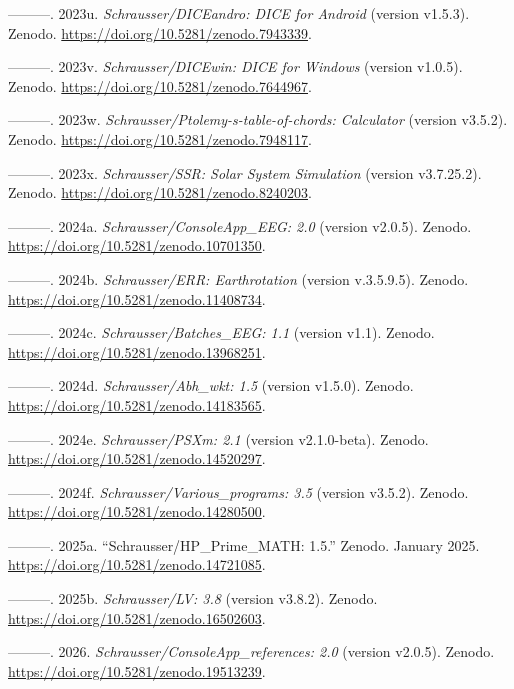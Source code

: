 \documentclass[
]{article}
\newlength{\cslhangindent}
\newlength{\cslentryspacingunit} %
\newenvironment{CSLReferences}[2] %
 {%
  \setlength{\parindent}{0pt}
  \ifodd #1
  \let\oldpar\par
  \def\par{\hangindent=\cslhangindent\oldpar}
  \fi
  \setlength{\parskip}{#2\cslentryspacingunit}
 }%
 {}
\begin{document}
\begin{CSLReferences}{1}{0}
\leavevmode{}%
---------. 2023u. \emph{{Schrausser/DICEandro: DICE for Android}}
(version v1.5.3). Zenodo. \url{https://doi.org/10.5281/zenodo.7943339}.

\leavevmode{}%
---------. 2023v. \emph{{Schrausser/DICEwin: DICE for Windows}} (version
{v1.0.5}). Zenodo. \url{https://doi.org/10.5281/zenodo.7644967}.

\leavevmode{}%
---------. 2023w. \emph{{Schrausser/Ptolemy-s-table-of-chords:
Calculator}} (version v3.5.2). Zenodo.
\url{https://doi.org/10.5281/zenodo.7948117}.

\leavevmode{}%
---------. 2023x. \emph{{Schrausser/SSR: Solar System Simulation}}
(version v3.7.25.2). Zenodo.
\url{https://doi.org/10.5281/zenodo.8240203}.

\leavevmode{}%
---------. 2024a. \emph{Schrausser/ConsoleApp\_EEG: 2.0} (version
v2.0.5). Zenodo. \url{https://doi.org/10.5281/zenodo.10701350}.

\leavevmode{}%
---------. 2024b. \emph{Schrausser/ERR: Earthrotation} (version
v.3.5.9.5). Zenodo. \url{https://doi.org/10.5281/zenodo.11408734}.

\leavevmode{}%
---------. 2024c. \emph{Schrausser/Batches\_EEG: 1.1} (version v1.1).
Zenodo. \url{https://doi.org/10.5281/zenodo.13968251}.

\leavevmode{}%
---------. 2024d. \emph{Schrausser/Abh\_wkt: 1.5} (version v1.5.0).
Zenodo. \url{https://doi.org/10.5281/zenodo.14183565}.

\leavevmode{}%
---------. 2024e. \emph{Schrausser/PSXm: 2.1} (version v2.1.0-beta).
Zenodo. \url{https://doi.org/10.5281/zenodo.14520297}.

\leavevmode{}%
---------. 2024f. \emph{Schrausser/Various\_programs: 3.5} (version
v3.5.2). Zenodo. \url{https://doi.org/10.5281/zenodo.14280500}.

\leavevmode{}%
---------. 2025a. {``{Schrausser/HP\_Prime\_MATH: 1.5}.''} Zenodo.
January 2025. \url{https://doi.org/10.5281/zenodo.14721085}.

\leavevmode{}%
---------. 2025b. \emph{Schrausser/LV: 3.8} (version v3.8.2). Zenodo.
\url{https://doi.org/10.5281/zenodo.16502603}.

\leavevmode{}%
---------. 2026. \emph{Schrausser/ConsoleApp\_references: 2.0} (version
v2.0.5). Zenodo. \url{https://doi.org/10.5281/zenodo.19513239}.

\end{CSLReferences}
\end{document}
